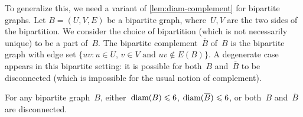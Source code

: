 \documentclass[a4paper,UKenglish,cleveref, autoref, thm-restate]{lipics-v2021}
\newcommand{\diam}{\textnormal{diam}}
\renewcommand{\le}{\leqslant}
\begin{document}
To generalize this, we need a variant of \cref{lem:diam-complement} for bipartite graphs.
Let $B = (U,V,E)$ be a bipartite graph, where~$U,V$ are the two sides of the bipartition.
We consider the choice of bipartition (which is not necessarily unique) to be a part of~$B$.
The bipartite complement~$\overline{B}$ of~$B$ is the bipartite graph with edge set $\{uv : \text{$u \in U$, $v \in V$ and $uv \not\in E(B)$} \}$.
A degenerate case appears in this bipartite setting:
it is possible for both~$B$ and~$\overline{B}$ to be disconnected (which is impossible for the usual notion of complement).
\begin{lemma}
  \label{lem:diam-complement-bipartite}
  For any bipartite graph~$B$,
  either~$\diam(B) \le \diamBoundBip$, $\diam(\overline{B}) \le \diamBoundBip$, or both~$B$ and~$\overline{B}$ are disconnected.
\end{lemma}
\end{document}
